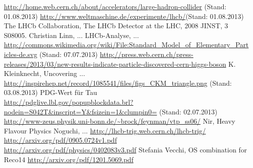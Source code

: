 \documentclass[a4paper]{scrbook}
\begin{document}
%
\tableofcontents


%

%
%
%

%

\begin{thebibliography}{---}
 \url{http://home.web.cern.ch/about/accelerators/large-hadron-collider} (Stand: 01.08.2013)
 \url{http://www.weltmaschine.de/experimente/lhcb/}(Stand: 01.08.2013)
 The LHCb Collaboration, The LHCb Detector at the LHC, 2008 JINST, 3 S08005.
 Christian Linn, ...
 LHCb-Analyse, ...
 \url{http://commons.wikimedia.org/wiki/File:Standard_Model_of_Elementary_Particles-de.svg} (Stand: 07.07.2013)
 \url{http://press.web.cern.ch/press-releases/2013/03/new-results-indicate-particle-discovered-cern-higgs-boson}
  K. Kleinknecht, Uncovering ...
 \url{http://inspirehep.net/record/1085541/files/figs_CKM_triangle.png} (Stand: 03.08.2013)
 PDG-Wert für Tau \\ \url{http://pdglive.lbl.gov/popupblockdata.brl?nodein=S042T&inscript=Y&fsizein=1&clumpin0=} (Stand: 02.07.2013)
 \url{http://www-zeus.physik.uni-bonn.de/~brock/feynman/vtp_ss06/}
 Nir, Heavy Flavour Physics
 Noguchi, ...
 \url{http://lhcb-trig.web.cern.ch/lhcb-trig/}
 \url{http://arxiv.org/pdf/0905.0724v1.pdf}
 \url{http://arxiv.org/pdf/physics/0402083v3.pdf}
 Stefania Vecchi, OS combination for Reco14
 \url{http://arxiv.org/pdf/1201.5069.pdf}
\end{thebibliography}
\end{document}
